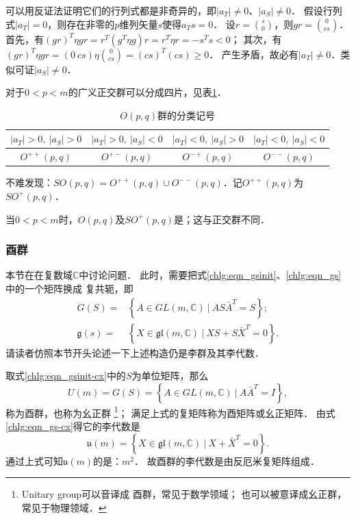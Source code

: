 可以用反证法证明它们的行列式都是非奇异的，即$|a_T| \neq 0$、$|a_S| \neq 0$．
假设行列式$|a_T| = 0$，则存在非零的$p$维列矢量$s$使得$a_T s =0$．
设$r=\binom{s}{0}$，则$gr=\binom{0}{cs}$．
首先，有$(gr)^T \eta gr = r^T (g^T \eta g) r = r^T \eta r = - s^T s <0 $；
其次，有$(gr)^T \eta gr = (0 \  cs) \eta \binom{0}{cs} = (cs)^T (cs)\geqslant 0$．
产生矛盾，故必有$|a_T| \neq 0$．类似可证$|a_S| \neq 0$．

对于$0 < p < m$的广义正交群可以分成四片，见表\ref{chlg:tab-GO}．

\begin{table}[htb]
    \centering
    \caption{$O(p,q)$群的分类记号} \label{chlg:tab-GO}
    \begin{tabular}{|*{4}{c|}}
        \hline 
        $| a_T| >0,\ | a_S |>0$ & $ |a_T| >0,\ | a_S |<0$ & $| a_T| <0,\ | a_S| >0$  & $| a_T| <0,\ | a_S| <0$ \\
        \hline
        $O^{++}(p,q)$ & $O^{+-}(p,q)$ & $O^{-+}(p,q)$ & $O^{--}(p,q)$   \\ 
        \hline
    \end{tabular}
\end{table}

不难发现：$SO(p,q)= O^{++}(p,q)\cup O^{--}(p,q)$．记$O^{++}(p,q)$为$SO^{+}(p,q)$．

当$0<p<m$时，$O(p,q)$及$SO^{+}(p,q)$是；这与正交群不同．

    

\subsubsection{酉群}\label{chlg:sec_unitary}

本节在在复数域$\mathbb{C}$中讨论问题．
此时，需要把式\eqref{chlg:eqn_gsinit}、\eqref{chlg:eqn_gs}中的一个矩阵换成
复共轭，即
\begin{align}
    G(S)=& \left\{ A \in GL(m,\mathbb{C})\ |\  A S \bar{A}^T =S \right\};\label{chlg:eqn_gsinit-cx} \\
    \mathfrak{g}(s) =& \left\{ X \in \mathfrak{gl}(m,\mathbb{C}) \ |\ 
    X S + S \bar{X}^T = 0 \right\} . \label{chlg:eqn_gs-cx}
\end{align}
请读者仿照本节开头论述一下上述构造仍是李群及其李代数．

取式\eqref{chlg:eqn_gsinit-cx}中的$S$为单位矩阵，那么
\begin{equation}\label{chlg:eqn_unitary}
    U(m)=G(S)= \left\{ A \in GL(m,\mathbb{C})\ |\ A \bar{A}^T =I \right\},
\end{equation}
称为{\heiti 酉群}，也称为{\heiti 幺正群}
\footnote{Unitary group可以音译成 {\kaishu 酉群}，常见于数学领域；
    也可以被意译成{\kaishu 幺正群}，常见于物理领域．}；
满足上式的复矩阵称为{\heiti 酉矩阵}或{\heiti 幺正矩阵}．
由式\eqref{chlg:eqn_gs-cx}得它的李代数是
\begin{equation}
    \mathfrak{u}(m)= \left\{ X \in 
    \mathfrak{gl}(m,\mathbb{C})\ |\ X  + \bar{X}^T =0 \right\}.
\end{equation}
通过上式可知$\mathfrak{u}(m)$的是：$m^2$．
故酉群的李代数是由反厄米复矩阵组成．

